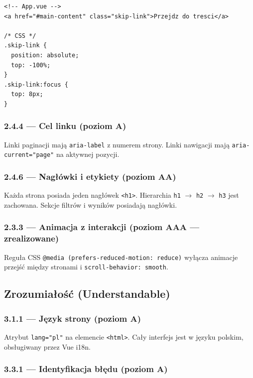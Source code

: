 \documentclass[12pt, a4paper]{article}
\begin{document}
\begin{lstlisting}[style=html, caption={Implementacja skip-linka}]
<!-- App.vue -->
<a href="#main-content" class="skip-link">Przejdz do tresci</a>

/* CSS */
.skip-link {
  position: absolute;
  top: -100%;
}
.skip-link:focus {
  top: 8px;
}
\end{lstlisting}

\subsubsection{2.4.4 — Cel linku (poziom A)}

Linki paginacji mają \texttt{aria-label} z numerem strony. Linki nawigacji mają
\texttt{aria-current="page"} na aktywnej pozycji.

\subsubsection{2.4.6 — Nagłówki i etykiety (poziom AA)}

Każda strona posiada jeden nagłówek \texttt{<h1>}. Hierarchia
\texttt{h1} $\to$ \texttt{h2} $\to$ \texttt{h3} jest zachowana. Sekcje filtrów
i wyników posiadają nagłówki.

\subsubsection{2.3.3 — Animacja z interakcji (poziom AAA --- zrealizowane)}

Reguła CSS \texttt{@media (prefers-reduced-motion: reduce)} wyłącza animacje
przejść między stronami i \texttt{scroll-behavior: smooth}.

\subsection{Zrozumiałość (Understandable)}

\subsubsection{3.1.1 — Język strony (poziom A)}

Atrybut \texttt{lang="pl"} na elemencie \texttt{<html>}. Cały interfejs jest w języku
polskim, obsługiwany przez Vue i18n.

\subsubsection{3.3.1 — Identyfikacja błędu (poziom A)}
\end{document}
